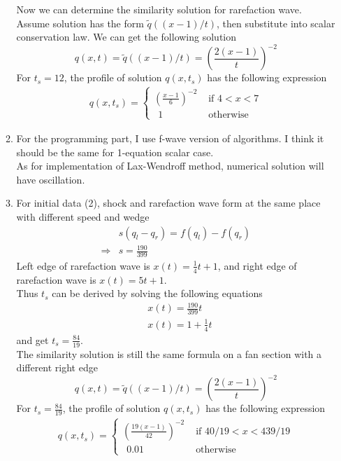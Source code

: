 \documentclass[11pt]{article}
\begin{document}
\begin{enumerate}
\begin{enumerate}
					Now we can determine the similarity solution for rarefaction wave. Assume solution has the form $\tilde{q}((x-1)/t)$, then substitute into scalar conservation law. We can get the following solution
					\[
					q(x,t)=\tilde{q}((x-1)/t)=(\frac{2(x-1)}{t})^{-2}
					\]
					For $t_s=12$, the profile of solution $q(x,t_s)$ has the following expression
					\begin{align*}
					q(x,t_s)=\begin{cases} (\frac{x-1}{6})^{-2} &\text{  if } 4<x<7 \\
					\ \ 1 &\text{  otherwise } 
					\end{cases}	
					\end{align*}
				
				\item
					For the programming part, I use f-wave version of algorithms. I think it should be the same for 1-equation scalar case. \\
					
					As for implementation of Lax-Wendroff method, numerical solution will have oscillation.
					
				\item
					For initial data (2), shock and rarefaction wave form at the same place with different speed and wedge
					\begin{align*}
					&s(q_l-q_r)=f(q_l)-f(q_r)\\
					\Rightarrow &s=\frac{190}{399}
					\end{align*}
					Left edge of rarefaction wave is $x(t)=\frac{1}{4}t+1$, and right edge of rarefaction wave is $x(t)=5t+1$.\\
					Thus $t_s$ can be derived by solving the following equations
					\begin{align*}
					&x(t)=\frac{190}{399}t\\
					&x(t)=1+\frac{1}{4}t
					\end{align*}
					and get $t_s=\frac{84}{19}$.\\
					
					The similarity solution is still the same formula on a fan section with a different right edge
					\[
					q(x,t)=\tilde{q}((x-1)/t)=(\frac{2(x-1)}{t})^{-2}
					\]
					For $t_s=\frac{84}{19}$, the profile of solution $q(x,t_s)$ has the following expression
					\begin{align*}
					q(x,t_s)=\begin{cases} (\frac{19(x-1)}{42})^{-2} &\text{  if } 40/19<x<439/19 \\
					\ \ 0.01 &\text{  otherwise } 
					\end{cases}	
					\end{align*}
					

\end{enumerate}
\end{enumerate}
\end{document}
